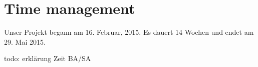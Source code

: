 \section{Time management}
\label{sec:Zeit Management}

Unser Projekt begann am 16. Februar, 2015. Es dauert 14 Wochen und endet am 29. Mai 2015.

todo: erklärung Zeit BA/SA